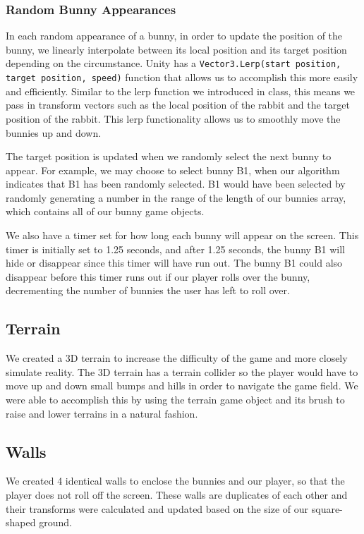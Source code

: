 \documentclass[12pt]{article}
\begin{document}
\subsubsection{Random Bunny Appearances}
  In each random appearance of a bunny, in order to update the position of the bunny, we linearly interpolate between its local position and its target position depending on the circumstance. Unity has a \verb+Vector3.Lerp(start position, target position, speed)+ function that allows us to accomplish this more easily and efficiently. Similar to the lerp function we introduced in class, this means we pass in transform vectors such as the local position of the rabbit and the target position of the rabbit. This lerp functionality allows us to smoothly move the bunnies up and down. 

  The target position is updated when we randomly select the next bunny to appear. For example, we may choose to select bunny B1, when our algorithm indicates that B1 has been randomly selected. B1 would have been selected by randomly generating a number in the range of the length of our bunnies array, which contains all of our bunny game objects. 

  We also have a timer set for how long each bunny will appear on the screen. This timer is initially set to 1.25 seconds, and after 1.25 seconds, the bunny B1 will hide or disappear since this timer will have run out. The bunny B1 could also disappear before this timer runs out if our player rolls over the bunny, decrementing the number of bunnies the user has left to roll over.


\subsection{Terrain}
  We created a 3D terrain to increase the difficulty of the game and more closely simulate reality. The 3D terrain has a terrain collider so the player would have to move up and down small bumps and hills in order to navigate the game field. We were able to accomplish this by using the terrain game object and its brush to raise and lower terrains in a natural fashion.

\subsection{Walls}
  We created 4 identical walls to enclose the bunnies and our player, so that the player does not roll off the screen. These walls are duplicates of each other and their transforms were calculated and updated based on the size of our square-shaped ground.
\end{document}
